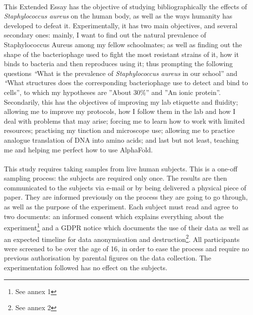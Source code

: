 \paragraph{}This Extended Essay has the objective of studying bibliographically the effects of \emph{Staphylococcus aureus} on the human body, as well as the ways humanity has developed to defeat it. Experimentally, it has two main objectives, and several secondary ones: mainly, I want to find out the natural prevalence of Staphylococcus Aureus among my fellow schoolmates; as well as finding out the shape of the bacteriophage used to fight the most resistant strains of it, how it binds to bacteria and then reproduces using it; thus prompting the following questions \emph“What is the prevalence of \emph{Staphylococcus aureus} in our school” and \emph“What structures does the corresponding bacteriophage use to detect and bind to cells”, to which my hypotheses are ”About 30\%” and ”An ionic protein”. Secondarily, this has the objectives of improving my lab etiquette and fluidity; allowing me to improve my protocols, how I follow them in the lab and how I deal with problems that may arise; forcing me to learn how to work with limited resources; practising my tinction and microscope use; allowing me to practice analogue translation of DNA into amino acids; and last but not least, teaching me and helping me perfect how to use AlphaFold.

\paragraph{}This study requires taking samples from live human subjects. This is a one-off sampling process: the subjects are required only once. The results are then communicated to the subjects via e-mail or by being delivered a physical piece of paper. They are informed previously on the process they are going to go through, as well as the purpose of the experiment. Each subject must read and agree to two documents: an informed consent which explains everything about the experiment\footnote{See annex 1} and a GDPR notice which documents the use of their data as well as an expected timeline for data anonymisation and destruction\footnote{See annex 2}. All participants were screened to be over the age of 16, in order to ease the process and require no previous authorisation by parental figures on the data collection. The experimentation followed has no effect on the subjects\cite{WhatGDPREU2018}.
